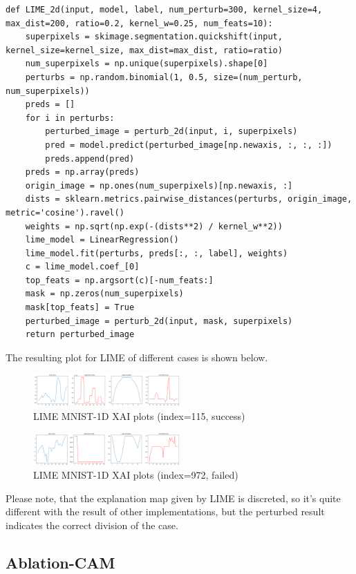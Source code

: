 \documentclass[conference]{IEEEtran}
\begin{document}
\begin{lstlisting}
def LIME_2d(input, model, label, num_perturb=300, kernel_size=4, max_dist=200, ratio=0.2, kernel_w=0.25, num_feats=10):
    superpixels = skimage.segmentation.quickshift(input, kernel_size=kernel_size, max_dist=max_dist, ratio=ratio)
    num_superpixels = np.unique(superpixels).shape[0]
    perturbs = np.random.binomial(1, 0.5, size=(num_perturb, num_superpixels))
    preds = []
    for i in perturbs:
        perturbed_image = perturb_2d(input, i, superpixels)
        pred = model.predict(perturbed_image[np.newaxis, :, :, :])
        preds.append(pred)
    preds = np.array(preds)
    origin_image = np.ones(num_superpixels)[np.newaxis, :]
    dists = sklearn.metrics.pairwise_distances(perturbs, origin_image, metric='cosine').ravel()
    weights = np.sqrt(np.exp(-(dists**2) / kernel_w**2))
    lime_model = LinearRegression()
    lime_model.fit(perturbs, preds[:, :, label], weights)
    c = lime_model.coef_[0]
    top_feats = np.argsort(c)[-num_feats:]
    mask = np.zeros(num_superpixels)
    mask[top_feats] = True
    perturbed_image = perturb_2d(input, mask, superpixels)
    return perturbed_image
\end{lstlisting}

The resulting plot for LIME of different cases is shown below.

\begin{figure}[h] 
    \centering
    \includegraphics[width=0.5\textwidth]{./pics/MNIST-1D/115T-L0P0/lime.png}
    \caption{LIME MNIST-1D XAI plots (index=115, success)} 
\end{figure}

\begin{figure}[h] 
    \centering
    \includegraphics[width=0.5\textwidth]{./pics/MNIST-1D/972F-L9P8/lime.png}
    \caption{LIME MNIST-1D XAI plots (index=972, failed)} 
\end{figure}

Please note, that the explanation map given by LIME is discreted, so it's quite different with the result of other implementations, but the perturbed result indicates the correct division of the case.

\subsection{Ablation-CAM}
\end{document}
